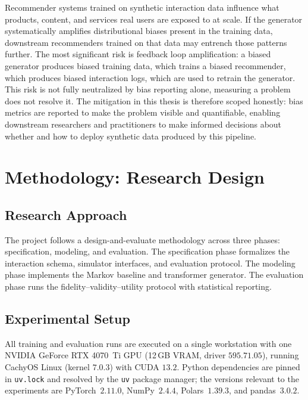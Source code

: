 \documentclass[sigconf,nonacm]{acmart}
\begin{document}
Recommender systems trained on synthetic interaction data influence what
products, content, and services real users are exposed to at scale. If the
generator systematically amplifies distributional biases present in the
training data, downstream recommenders trained on that data may entrench
those patterns further. The most significant risk is feedback loop
amplification: a biased generator produces biased training data, which
trains a biased recommender, which produces biased interaction logs, which
are used to retrain the generator. This risk is not fully neutralized by
bias reporting alone, measuring a problem does not resolve it. The
mitigation in this thesis is therefore scoped honestly: bias metrics are
reported to make the problem visible and quantifiable, enabling downstream
researchers and practitioners to make informed decisions about whether and
how to deploy synthetic data produced by this pipeline.


\section{Methodology: Research Design}
\label{sec:method-design}

\subsection{Research Approach}
The project follows a design-and-evaluate methodology across three phases:
specification, modeling, and evaluation. The specification phase formalizes
the interaction schema, simulator interfaces, and evaluation protocol. The
modeling phase implements the Markov baseline and transformer generator.
The evaluation phase runs the fidelity–validity–utility protocol with
statistical reporting.

\subsection{Experimental Setup}
All training and evaluation runs are executed on a single workstation
with one NVIDIA GeForce RTX 4070~Ti GPU (12\,GB VRAM, driver
$595.71.05$), running CachyOS Linux (kernel $7.0.3$) with CUDA $13.2$. Python dependencies are pinned in
\texttt{uv.lock} and resolved by the \texttt{uv} package manager; the
versions relevant to the experiments are PyTorch~$2.11.0$, NumPy~$2.4.4$,
Polars~$1.39.3$, and pandas~$3.0.2$.
\end{document}
